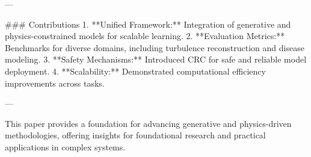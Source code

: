 ---

### Contributions  
1. **Unified Framework:** Integration of generative and physics-constrained models for scalable learning.  
2. **Evaluation Metrics:** Benchmarks for diverse domains, including turbulence reconstruction and disease modeling.  
3. **Safety Mechanisms:** Introduced CRC for safe and reliable model deployment.  
4. **Scalability:** Demonstrated computational efficiency improvements across tasks.

--- 

This paper provides a foundation for advancing generative and physics-driven methodologies, offering insights for foundational research and practical applications in complex systems.